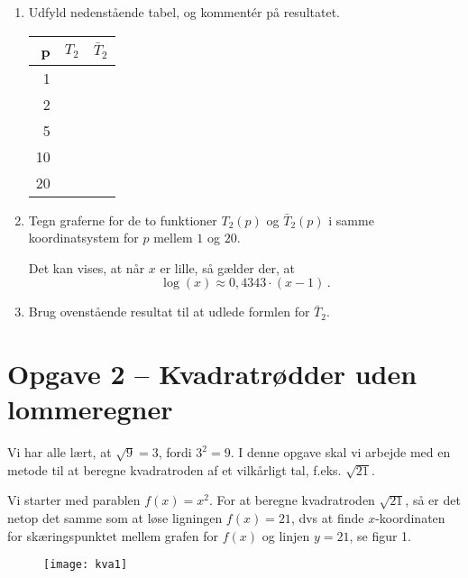 \documentclass[12pt,oneside,a4paper]{article}
\theoremstyle{plain}
\begin{document}
\begin{enumerate}[label=(\alph*), resume]
    \item Udfyld nedenstående tabel, og kommentér på resultatet.
        \begin{center}
            \begin{tabular}{|r|c|l|}
\hline
                p & $T_2$ & $\bar T_2$ \\
                \hline
                1 & & \\
                \hline
                2 & & \\
                \hline
                5 & & \\
                \hline
                10 & & \\
                \hline
                20 & & \\
                \hline
            \end{tabular}
        \end{center}

    \item Tegn graferne for de to funktioner $T_2(p)$ og $\bar T_2(p)$ i samme
        koordinatsystem for $p$ mellem $1$ og $20$.

Det kan vises, at når $x$ er lille, så gælder der, at
        \[
            \log(x) \approx 0,4343 \cdot (x-1) \,.
        \]

    \item Brug ovenstående resultat til at udlede formlen for $\bar T_2$.

\end{enumerate}


\section*{Opgave 2 -- Kvadratrødder uden lommeregner}
Vi har alle lært, at $\sqrt{9} = 3$, fordi $3^2 = 9$. I denne opgave skal vi
arbejde med en metode til at beregne kvadratroden af et vilkårligt tal, f.eks.
$\sqrt{21}$.

Vi starter med parablen $f(x) = x^2$. For at beregne kvadratroden $\sqrt{21}$,
så er det netop det samme som at løse ligningen $f(x) = 21$, dvs at finde
$x$-koordinaten for skæringspunktet mellem grafen for $f(x)$ og linjen $y=21$,
se figur 1.

\begin{figure}[ht]
    \centering
    \texttt{[image: kva1]}
    \caption{}
    \label{fig1}
\end{figure}
\end{document}
